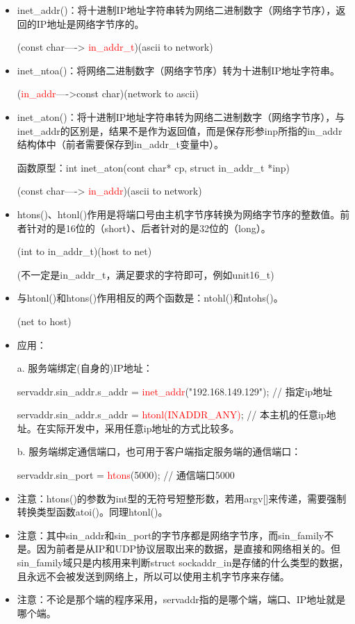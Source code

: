 \documentclass[UTF8]{article}%
\begin{document}
\begin{itemize}
    \item inet\_addr()：将十进制IP地址字符串转为网络二进制数字（网络字节序），返回的IP地址是网络字节序的。
    
    (const char----> \textcolor{red}{in\_addr\_t})(ascii to network)

    \item inet\_ntoa()：将网络二进制数字（网络字节序）转为十进制IP地址字符串。
    
    (\textcolor{red}{in\_addr}---->const char)(network to ascii)

    \item inet\_aton()：将十进制IP地址字符串转为网络二进制数字（网络字节序），与inet\_addr的区别是，结果不是作为返回值，而是保存形参inp所指的in\_addr结构体中（前者需要保存到in\_addr\_t变量中）。
    
    函数原型：int inet\_aton(cont char* cp, struct in\_addr\_t *inp)
    
    (const char----> \textcolor{red}{in\_addr})(ascii to network)

    \item htons()、htonl()作用是将端口号由主机字节序转换为网络字节序的整数值。前者针对的是16位的（short）、后者针对的是32位的（long）。
    
    (int to in\_addr\_t)(host to net)
    
    (不一定是in\_addr\_t，满足要求的字符即可，例如unit16\_t)

    \item 与htonl()和htons()作用相反的两个函数是：ntohl()和ntohs()。
    
    (net to host)
    
    \item 应用：
    
    a. 服务端绑定(自身的)IP地址：

    servaddr.sin\_addr.s\_addr = \textcolor{red}{inet\_addr}("192.168.149.129");  // 指定ip地址  
    
    servaddr.sin\_addr.s\_addr = \textcolor{red}{htonl(INADDR\_ANY)};  // 本主机的任意ip地址。在实际开发中，采用任意ip地址的方式比较多。

    b. 服务端绑定通信端口，也可用于客户端指定服务端的通信端口：
    
    servaddr.sin\_port = \textcolor{red}{htons}(5000);  // 通信端口5000

    \item 注意：htons()的参数为int型的无符号短整形数，若用argv[]来传递，需要强制转换类型函数atoi()。同理htonl()。
    \item 注意：其中sin\_addr和sin\_port的字节序都是网络字节序，而sin\_family不是。因为前者是从IP和UDP协议层取出来的数据，是直接和网络相关的。但sin\_family域只是内核用来判断struct sockaddr\_in是存储的什么类型的数据，且永远不会被发送到网络上，所以可以使用主机字节序来存储。
    \item 注意：不论是那个端的程序采用，servaddr指的是哪个端，端口、IP地址就是哪个端。

\end{itemize}
\end{document}
